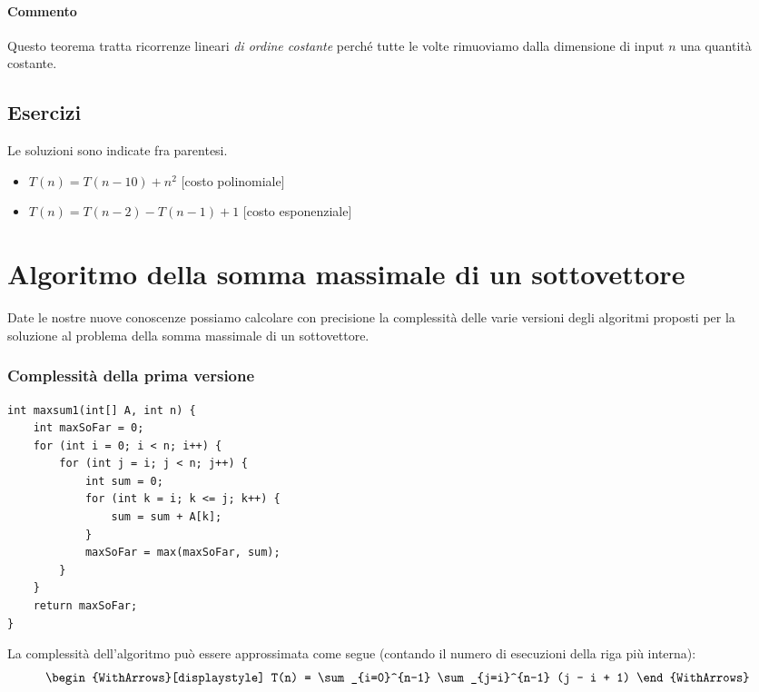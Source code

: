 \paragraph{Commento}
Questo teorema tratta ricorrenze lineari \emph{di ordine costante} perché tutte le volte rimuoviamo dalla dimensione di input \(n\) una quantità costante.

\subsection*{Esercizi}

Le soluzioni sono indicate fra parentesi.
\begin{itemize}[label=\textbullet]
	\item \(T(n) = T(n-10) + n^2\) \hfill[costo polinomiale]
	\item \(T(n) = T(n-2) - T(n-1) + 1\) \hfill[costo esponenziale]
\end{itemize}

\section{Algoritmo della somma massimale di un sottovettore}

Date le nostre nuove conoscenze possiamo calcolare con precisione la complessità delle varie versioni degli algoritmi proposti per la soluzione al problema della somma massimale di un sottovettore.

\subsubsection*{Complessità della prima versione}

\begin{code}
\begin{verbatim}
int maxsum1(int[] A, int n) {
	int maxSoFar = 0;
	for (int i = 0; i < n; i++) {
		for (int j = i; j < n; j++) {
			int sum = 0;
			for (int k = i; k <= j; k++) {
				sum = sum + A[k];
			}
			maxSoFar = max(maxSoFar, sum);
		}
	}
	return maxSoFar;
}
\end{verbatim}
\end{code}

La complessità dell'algoritmo può essere approssimata come segue (contando il numero di esecuzioni della riga più interna):
\[\begin{WithArrows}[displaystyle]
T(n) = \sum_{i=0}^{n-1} \sum_{j=i}^{n-1} (j - i + 1)
\end{WithArrows}\]

